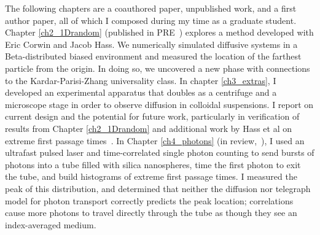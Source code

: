

The following chapters are a coauthored paper, unpublished work, and a first author paper, all of which I composed during my time as a graduate student. Chapter \ref{ch2_1Drandom} (published in PRE~\cite{hass_anomalous_2023}) explores a method developed with Eric Corwin and Jacob Hass. We numerically simulated diffusive systems in a Beta-distributed biased environment and measured the location of the farthest particle from the origin. In doing so, we uncovered a new phase with connections to the Kardar-Parisi-Zhang universality class. In chapter \ref{ch3_extras}, I developed an experimental apparatus that doubles as a centrifuge and a microscope stage in order to observe diffusion in colloidal suspensions. I report on current design and the potential for future work, particularly in verification of results from Chapter \ref{ch2_1Drandom} and additional work by Hass et al on extreme first passage times~\cite{hass_first-passage_2024}. In Chapter \ref{ch4_photons} (in review,~\cite{carroll-godfrey_measurements_2025}), I used an ultrafast pulsed laser and time-correlated single photon counting to send bursts of photons into a tube filled with silica nanospheres, time the first photon to exit the tube, and build histograms of extreme first passage times. I measured the peak of this distribution, and determined that neither the diffusion nor telegraph model for photon transport correctly predicts the peak location; correlations cause more photons to travel directly through the tube as though they see an index-averaged medium.